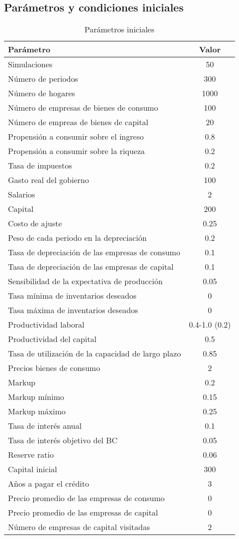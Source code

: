 \documentclass[12pt,a4paper]{article}
\begin{document}
\subsection{Parámetros y condiciones iniciales}
\begin{table}[ht]
\caption{Parámetros iniciales}
\begin{tabular}{|l|c|}
\hline 
Parámetro & Valor \\
\hline 
	Simulaciones & 50 \\
   Número de periodos & 300 \\ 
  Número de hogares & 1000\\ 
  Número de empresas de bienes de consumo & 100\\ 
  Número de empreas de bienes de capital & 20\\ 
  Propensión a consumir sobre el ingreso & 0.8\\ 
  Propensión a consumir sobre la riqueza & 0.2\\ 
  Tasa de impuestos & 0.2\\ 
  Gasto real del gobierno & 100\\ 
  Salarios & 2\\ 
   Capital & 200\\ 
   Costo de ajuste & 0.25\\ 
   Peso de cada periodo en la depreciación & 0.2\\ 
   Tasa de depreciación de las empresas de consumo & 0.1\\ 
   Tasa de depreciación de las empresas de capital & 0.1\\ 
   Sensibilidad de la expectativa de producción & 0.05\\ 
   Tasa mínima de inventarios deseados & 0\\ 
   Tasa máxima de inventarios deseados & 0\\ 
   Productividad laboral  & 0.4-1.0 (0.2)\\ 
   Productividad del capital & 0.5\\ 
   Tasa de utilización de la capacidad de largo plazo & 0.85\\ 
   Precios bienes de consumo & 2\\ 
   Markup & 0.2\\ 
   Markup mínimo & 0.15\\ 
   Markup máximo & 0.25\\ 
   Tasa de interés anual & 0.1\\ 
   Tasa de interés objetivo del BC & 0.05\\ 
   Reserve ratio & 0.06\\ 
   Capital inicial & 300\\ 
   Años a pagar el crédito & 3\\ 
   Precio promedio de las empresas de consumo & 0\\ 
   Precio promedio de las empresas de capital & 0\\ 
   Número de empresas de capital visitadas & 2\\ 

\hline 
\end{tabular}
  \label{Tab:Tcr}
\end{table}
\restoregeometry
\end{document}
